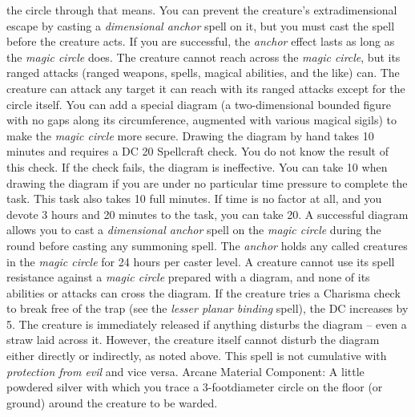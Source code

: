 the circle through that means. You can prevent the creature's extradimensional
escape by casting a \textit{dimensional anchor} spell on it, but you must cast
the spell before the creature acts. If you are successful, the \textit{anchor} effect
lasts as long as the \textit{magic circle} does. The creature cannot reach across
the \textit{magic circle}, but its ranged attacks (ranged weapons, spells, magical
abilities, and the like) can. The creature can attack any target it can reach with
its ranged attacks except for the circle itself.
You can add a special diagram (a two-dimensional bounded figure with no gaps along
its circumference, augmented with various magical sigils) to make the \textit{magic
circle} more secure. Drawing the diagram by hand takes 10 minutes and requires
a DC 20 Spellcraft check. You do not know the result of this check. If the check
fails, the diagram is ineffective. You can take 10 when drawing the diagram if
you are under no particular time pressure to complete the task. This task also
takes 10 full minutes. If time is no factor at all, and you devote 3 hours and
20 minutes to the task, you can take 20.
A successful diagram allows you to cast a \textit{dimensional anchor} spell on
the \textit{magic circle} during the round before casting any summoning spell.
The \textit{anchor} holds any called creatures in the \textit{magic circle} for
24 hours per caster level. A creature cannot use its spell resistance against a
\textit{magic circle} prepared with a diagram, and none of its abilities or attacks
can cross the diagram. If the creature tries a Charisma check to break free of
the trap (see the \textit{lesser planar binding} spell), the DC increases by 5.
The creature is immediately released if anything disturbs the diagram -- even a
straw laid across it. However, the creature itself cannot disturb the diagram either
directly or indirectly, as noted above.
This spell is not cumulative with \textit{protection from evil} and vice versa.
Arcane Material Component: A little powdered silver with which you trace
a 3-footdiameter circle on the floor (or ground) around the creature to be warded.